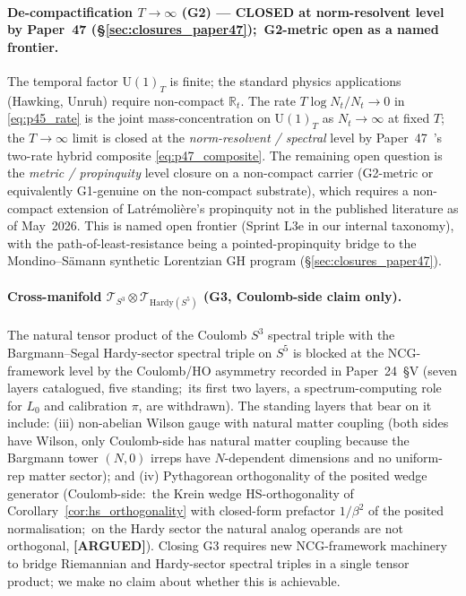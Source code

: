 \documentclass[11pt,a4paper]{article}
\theoremstyle{plain}
\theoremstyle{definition}
\newcommand{\Nt}{N_{t}}
\newcommand{\sthree}{S^{3}}
\newcommand{\sfive}{S^{5}}
\newcommand{\Tcal}{\mathcal{T}}
\newcommand{\R}{\mathbb{R}}
\newcommand{\Uone}{\mathrm{U}(1)}
\begin{document}
\paragraph{De-compactification $T \to \infty$ (G2) --- CLOSED at
norm-resolvent level by Paper~47 (\S\ref{sec:closures_paper47});\
G2-metric open as a named frontier.}
The temporal factor $\Uone_{T}$ is finite; the standard physics
applications (Hawking, Unruh) require non-compact $\R_{t}$.  The
rate $T\log\Nt/\Nt \to 0$ in \eqref{eq:p45_rate} is the joint
mass-concentration on $\Uone_{T}$ as $\Nt \to \infty$ at fixed $T$;
the $T \to \infty$ limit is closed at the \emph{norm-resolvent /
spectral} level by Paper~47~\cite{paper47}'s two-rate hybrid
composite \eqref{eq:p47_composite}.  The remaining open question is
the \emph{metric / propinquity} level closure on a non-compact carrier
(G2-metric or equivalently G1-genuine on the non-compact substrate),
which requires a non-compact extension of Latr\'emoli\`ere's
propinquity not in the published literature as of May~2026.  This is
named open frontier (Sprint L3e in our internal taxonomy),
with the path-of-least-resistance being a pointed-propinquity bridge
to the Mondino--S\"amann synthetic Lorentzian GH program
(\S\ref{sec:closures_paper47}).

\paragraph{Cross-manifold $\Tcal_{\sthree} \otimes
\Tcal_{\mathrm{Hardy}(\sfive)}$ (G3, Coulomb-side claim only).}
The natural tensor product of the Coulomb $\sthree$ spectral triple
with the Bargmann--Segal Hardy-sector spectral triple on $\sfive$
\cite{paper24} is blocked at the NCG-framework level by the Coulomb/HO
asymmetry recorded in Paper~24~\S V (seven layers catalogued, five
standing;\ its first two layers, a spectrum-computing role for $L_0$
and calibration $\pi$, are withdrawn).  The standing layers that bear
on it include:
(iii) non-abelian Wilson gauge with natural matter coupling (both
sides have Wilson, only Coulomb-side has natural matter coupling
because the Bargmann tower $(N,0)$ irreps have $N$-dependent
dimensions and no uniform-rep matter sector); and (iv) Pythagorean
orthogonality of the posited wedge generator (Coulomb-side:\ the Krein
wedge HS-orthogonality of Corollary~\ref{cor:hs_orthogonality} with
closed-form prefactor $1/\beta^{2}$ of the posited normalisation;\ on the
Hardy sector the natural analog operands are not orthogonal,
\textbf{[ARGUED]}).  Closing G3 requires new
NCG-framework machinery to bridge Riemannian and Hardy-sector spectral
triples in a single tensor product; we make no claim about whether
this is achievable.
\end{document}

